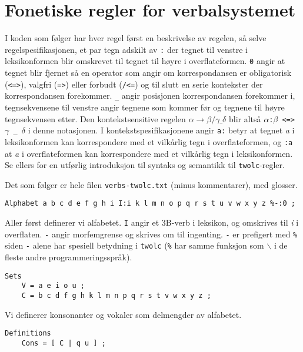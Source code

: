 \documentclass{article}
\let\code\texttt
\let\prog\texttt
\let\w\emph
\begin{document}
\section{Fonetiske regler for verbalsystemet}
\label{verbphon}
I koden som f\o{}lger har hver regel f\o{}rst en beskrivelse av regelen,
s\aa{} selve regelspesifikasjonen, et par tegn adskilt av \code{:} der tegnet
til venstre i leksikonformen blir omskrevet til tegnet til h\o{}yre i
overflateformen. \code{0} angir at tegnet blir fjernet s\aa{} en operator som
angir om korrespondansen er obligatorisk (\code{<=>}), valgfri (\code{=>})
eller forbudt (\code{/<=}) og til slutt en serie kontekster der
korrespondansen forekommer. \code{\_} angir posisjonen korrespondansen
forekommer i, tegnsekvensene til venstre angir tegnene som kommer f\o{}r og
tegnene til h\o{}yre tegnsekvensen etter. Den kontekstsensitive regelen
$\alpha \to \beta/\gamma \_ \delta$ blir alts\aa{} \code{$\alpha$:$\beta$ <=>
$\gamma$ \_ $\delta$} i denne notasjonen. I kontekstspesifikasjonene angir
\code{a:} betyr at tegnet \w{a} i leksikonformen kan korrespondere med et
vilk\aa{}rlig tegn i overflateformen, og \code{:a} at \w{a} i overflateformen
kan korrespondere med et vilk\aa{}rlig tegn i leksikonformen. Se ellers
 for en utf\o{}rlig introduksjon til syntaks og semantikk til
\prog{twolc}-regler.

Det som f\o{}lger er hele filen \code{verbs-twolc.txt} (minus kommentarer),
med glosser.

\lstset{basicstyle=\small,numbers=left}
\begin{lstlisting}[name=verbs-twolc.txt]
Alphabet a b c d e f g h i I:i k l m n o p q r s t u v w x y z %-:0 ;
\end{lstlisting}

Aller f\o{}rst definerer vi alfabetet. \code{I} angir et 3B-verb i leksikon,
og omskrives til \w{i} i overflaten. \code{-} angir morfemgrense og skrives om
til ingenting. \code{-} er prefigert med \code{\%} siden \code{-} alene har
spesiell betydning i \prog{twolc} (\code{\%} har samme funksjon som
$\backslash$ i de fleste andre programmeringsspr\aa{}k).

\begin{lstlisting}[name=verbs-twolc.txt]
Sets
    V = a e i o u ;
    C = b c d f g h k l m n p q r s t v w x y z ;
\end{lstlisting}

Vi definerer konsonanter og vokaler som delmengder av alfabetet.

\begin{lstlisting}[name=verbs-twolc.txt]
Definitions
    Cons = [ C | q u ] ;
\end{lstlisting}
\end{document}
